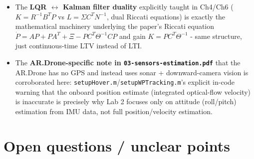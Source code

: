 \documentclass[11pt]{article}
\begin{document}
\begin{itemize}
\item The \textbf{LQR $\leftrightarrow$ Kalman filter duality} explicitly taught in Ch4/Ch6 ($K=R^{-1}B^TP$ vs $L=\Sigma C^TN^{-1}$, dual Riccati equations) is exactly the mathematical machinery underlying the paper's Riccati equation $\dot P=AP+PA^T+\Xi-PC^T\Theta^{-1}CP$ and gain $K=PC^T\Theta^{-1}$ - same structure, just continuous-time LTV instead of LTI.
\item The \textbf{AR.Drone-specific note in \texttt{03-\allowbreak{}sensors-\allowbreak{}estimation.pdf}} that the AR.Drone has no GPS and instead uses sonar + downward-camera vision is corroborated here: \texttt{setupHover.m}/\texttt{setupWPTracking.m}'s explicit in-code warning that the onboard position estimate (integrated optical-flow velocity) is inaccurate is precisely why Lab 2 focuses only on attitude (roll/pitch) estimation from IMU data, not full position/velocity estimation.
\end{itemize}

\section{Open questions / unclear points}
\end{document}
